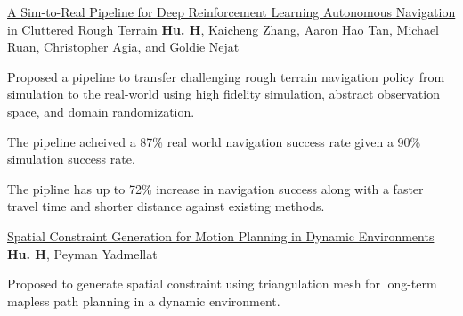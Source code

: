 


\begin{cventries}
  \cvpublicationentrysimple
    {\href{https://ieeexplore.ieee.org/document/9468918}{A Sim-to-Real Pipeline for Deep Reinforcement Learning Autonomous Navigation in Cluttered Rough Terrain}} %
    {\textbf{Hu. H}, Kaicheng Zhang, Aaron Hao Tan, Michael Ruan, Christopher Agia, and Goldie Nejat \hspace*{0pt}\hfill {}} %
    {
    \begin{cvitems}
      \item{
        Proposed a pipeline to transfer challenging rough terrain navigation policy from simulation to the real-world using high fidelity simulation, abstract observation space, and domain randomization.
      }
      \item{
        The pipeline acheived a 87\% real world navigation success rate given a 90\% simulation success rate.
			}
      \item{
				The pipline has up to 72\% increase in navigation success along with a faster travel time and shorter distance against existing methods.
      }
    \end{cvitems}
    }
  \cvpublicationentrysimple
    {\href{https://arxiv.org/abs/2110.14786}{Spatial Constraint Generation for Motion Planning in Dynamic Environments}} %
    {\textbf{Hu. H}, Peyman Yadmellat \hspace*{0pt}\hfill {}} %
    {
    \begin{cvitems}
      \item {Proposed to generate spatial constraint using triangulation mesh for long-term mapless path planning in a dynamic environment.}

\end{cvitems}}
\end{cventries}
